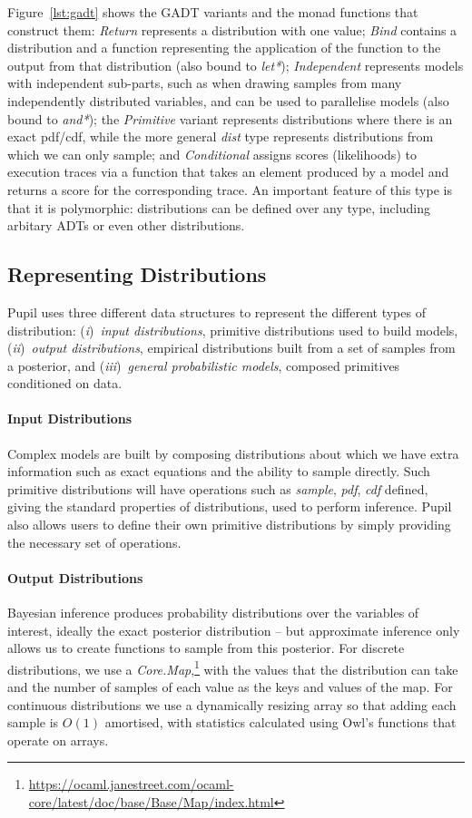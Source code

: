 \documentclass[sigconf,timestamp]{acmart}
\newcommand{\one}{({\em i})\/}
\newcommand{\two}{({\em ii})\/}
\newcommand{\three}{({\em iii})\/}
\newcommand{\pupil}{Pupil\xspace}
\begin{document}
Figure~\ref{lst:gadt} shows the GADT variants and the monad functions that construct them: \emph{Return} represents a distribution with one value; \emph{Bind} contains a distribution and a function representing the application of the function to the output from that distribution (also bound to \emph{let*}); \emph{Independent} represents models with independent sub-parts, such as when drawing samples from many independently distributed variables, and can be used to parallelise models (also bound to \emph{and*}); the \emph{Primitive} variant represents distributions where there is an exact pdf/cdf, while the more general \emph{dist} type represents distributions from which we can only sample; and \emph{Conditional} assigns scores (likelihoods) to execution traces via a function that takes an element produced by a model and returns a score for the corresponding trace. An important feature of this type is that it is polymorphic: distributions can be defined over any type, including arbitary ADTs or even other distributions.

\subsection{Representing Distributions}
\pupil uses three different data structures to represent the different types of distribution: \one~\emph{input distributions}, primitive distributions used to build models, \two~\emph{output distributions}, empirical distributions built from a set of samples from a posterior, and \three~\emph{general probabilistic models}, composed primitives conditioned on data.

\paragraph{Input Distributions}
Complex models are built by composing distributions about which we have extra information such as exact equations and the ability to sample directly. Such primitive distributions will have operations such as \emph{sample}, \emph{pdf}, \emph{cdf} defined, giving the standard properties of distributions, used to perform inference. \pupil also allows users to define their own primitive distributions by simply providing the necessary set of operations.

\paragraph{Output Distributions}
Bayesian inference produces probability distributions over the variables of interest, ideally the exact posterior distribution -- but approximate inference only allows us to create functions to sample from this posterior. For discrete distributions, we use a \emph{Core.Map},\footnote{\url{https://ocaml.janestreet.com/ocaml-core/latest/doc/base/Base/Map/index.html}} with the values that the distribution can take and the number of samples of each value as the keys and values of the map. For continuous distributions we use a dynamically resizing array so that adding each sample is $O(1)$ amortised, with statistics calculated using Owl's functions that operate on arrays.
\end{document}
